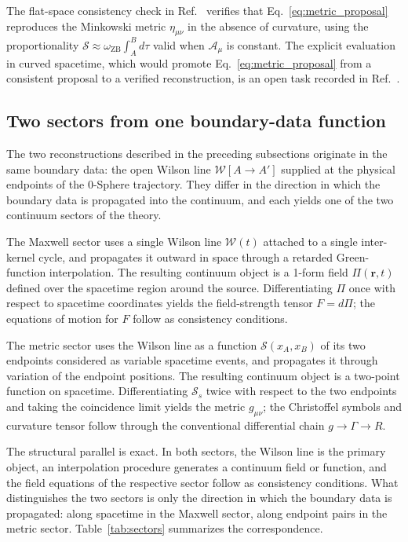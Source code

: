 \documentclass[%
 reprint, amsmath,amssymb, aps, prb, ]{revtex4-2}
\numberwithin{equation}{section}
\newcommand{\omZB}{\omega_{\text{ZB}}}
\newcommand{\WL}{\mathcal{W}}
\begin{document}
The flat-space consistency check in Ref.~\cite{hanamura51} verifies that Eq.~\eqref{eq:metric_proposal} reproduces the Minkowski metric $\eta_{\mu\nu}$ in the absence of curvature, using the proportionality $\mathcal{S} \approx \omZB \int_A^B d\tau$ valid when $\mathcal{A}_\mu$ is constant. The explicit evaluation in curved spacetime, which would promote Eq.~\eqref{eq:metric_proposal} from a consistent proposal to a verified reconstruction, is an open task recorded in Ref.~\cite{hanamura51}.

\subsection{Two sectors from one boundary-data function}

The two reconstructions described in the preceding subsections originate in the same boundary data: the open Wilson line $\WL[A\to A']$ supplied at the physical endpoints of the 0-Sphere trajectory. They differ in the direction in which the boundary data is propagated into the continuum, and each yields one of the two continuum sectors of the theory.

The Maxwell sector uses a single Wilson line $\WL(t)$ attached to a single inter-kernel cycle, and propagates it outward in space through a retarded Green-function interpolation. The resulting continuum object is a 1-form field $\Pi(\mathbf{r},t)$ defined over the spacetime region around the source. Differentiating $\Pi$ once with respect to spacetime coordinates yields the field-strength tensor $F = d\Pi$; the equations of motion for $F$ follow as consistency conditions.

The metric sector uses the Wilson line as a function $\mathcal{S}(x_A, x_B)$ of its two endpoints considered as variable spacetime events, and propagates it through variation of the endpoint positions. The resulting continuum object is a two-point function on spacetime. Differentiating $\mathcal{S}_s$ twice with respect to the two endpoints and taking the coincidence limit yields the metric $g_{\mu\nu}$; the Christoffel symbols and curvature tensor follow through the conventional differential chain $g \to \Gamma \to R$.

The structural parallel is exact. In both sectors, the Wilson line is the primary object, an interpolation procedure generates a continuum field or function, and the field equations of the respective sector follow as consistency conditions. What distinguishes the two sectors is only the direction in which the boundary data is propagated: along spacetime in the Maxwell sector, along endpoint pairs in the metric sector. Table~\ref{tab:sectors} summarizes the correspondence.
\end{document}
